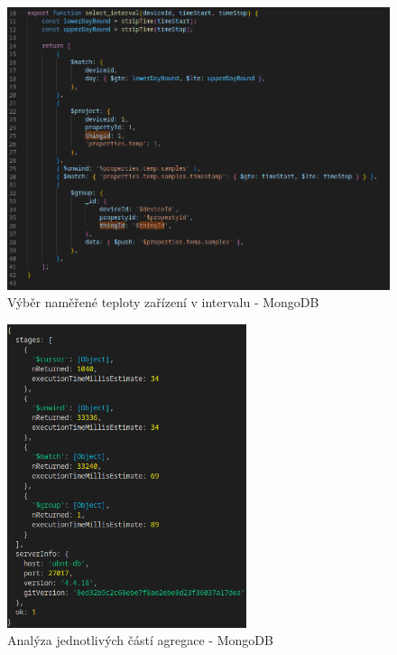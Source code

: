 \documentclass{article}
\begin{document}
\begin{figure}[htbp]
\includegraphics[width=14cm]{images/select_interval.png}
\centering 
\caption{Výběr naměřené teploty zařízení v intervalu - MongoDB \label{fig:simple:query}} 
\end{figure} 

\begin{figure}[htbp]
\includegraphics[width=7cm]{images/select_interval_explain.png}
\centering 
\caption{Analýza jednotlivých částí agregace - MongoDB \label{fig:simple:query:explain}} 
\end{figure} 
\end{document}
